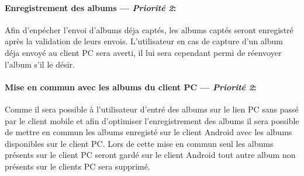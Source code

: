 \paragraph{Enregistrement des albums ---  \textit{Priorité 2}:} 
Afin d'enpécher l'envoi d'albums déja captés, les albums captés seront enregistré après la validation de leurs envois. 
L'utilisateur en cas de capture d'un album déja envoyé au client PC sera averti, il lui sera cependant permi de réenvoyer l'album s'il le désir.

\paragraph{Mise en commun avec les albums du client PC ---  \textit{Priorité 2}:} 
Comme il sera possible à l'utilisateur d'entré des albums sur le lien PC sans passé par le client mobile et afin d'optimiser l'enregistrement des albums il sera possible de mettre en commun les albums enregisté sur le client Android avec les albums disponibles sur le client PC.
Lors de cette mise en commun seul les albums présents sur le client PC seront gardé sur le client Android tout autre album non présents sur le clients PC sera supprimé.  

